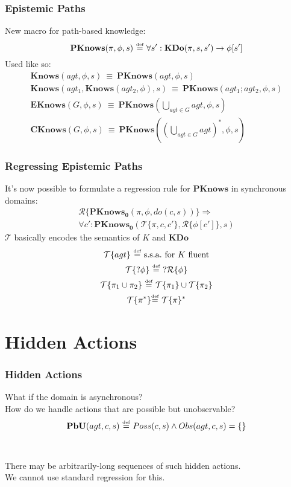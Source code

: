 \documentclass{beamer}
\newcommand{\isdef}{\hbox{$\stackrel{\mbox{\tiny def}}{=}$}}
\begin{document}
\begin{frame}
\frametitle{Epistemic Paths}
New macro for path-based knowledge:
\begin{equation*}
\mathbf{PKnows}(\pi,\phi,s)\ \isdef\ \forall s': \mathbf{KDo}(\pi,s,s') \rightarrow \phi[s']
\end{equation*}
Used like so:
\begin{gather*}
\mathbf{Knows}(agt,\phi,s)\ \equiv\ \mathbf{PKnows}(agt,\phi,s)\\
\mathbf{Knows}(agt_1,\mathbf{Knows}(agt_2,\phi),s)\ \equiv\ \mathbf{PKnows}(agt_1 ; agt_2,\phi,s)\\
\mathbf{EKnows}(G,\phi,s)\ \equiv\ \mathbf{PKnows}(\bigcup_{agt \in G}agt,\phi,s)\\
\mathbf{CKnows}(G,\phi,s)\ \equiv\ \mathbf{PKnows}((\bigcup_{agt \in G}agt)^*,\phi,s)
\end{gather*}
\end{frame}

\begin{frame}
\frametitle{Regressing Epistemic Paths}
It's now possible to formulate a regression rule for $\mathbf{PKnows}$ in synchronous domains:
\begin{multline*}
\mathcal{R}\{\mathbf{PKnows_0}(\pi,\phi,do(c,s))\} \Rightarrow \\
 \forall c': \mathbf{PKnows_0}(\mathcal{T}\{\pi,c,c'\},\mathcal{R}\{\phi[c']\},s)
\end{multline*}
$\mathcal{T}$ basically encodes the semantics of $K$ and $\mathbf{KDo}$
\begin{gather*}
\mathcal{T}\{agt\}\ \isdef\ \mathrm{s.s.a.\ for}\ K\ \mathrm{fluent} \\
\mathcal{T}\{?\phi\}\ \isdef\ ?\mathcal{R}\{\phi\} \\
\mathcal{T}\{\pi_1\cup\pi_2\}\ \isdef\ \mathcal{T}\{\pi_1\}\cup\mathcal{T}\{\pi_2\} \\
\mathcal{T}\{\pi^*\} \isdef\ \mathcal{T}\{\pi\}^*
\end{gather*}
\end{frame}

\section{Hidden Actions}

\begin{frame}
\frametitle{Hidden Actions}
What if the domain is asynchronous?\\
How do we handle actions that are possible but unobservable?
\begin{equation*}
\mathbf{PbU}(agt,c,s)\ \isdef\ Poss(c,s) \wedge Obs(agt,c,s)=\{\}
\end{equation*}
\ \\
\ \\
There may be arbitrarily-long sequences of such hidden actions.\\
We cannot use standard regression for this.
\end{frame}
\end{document}
